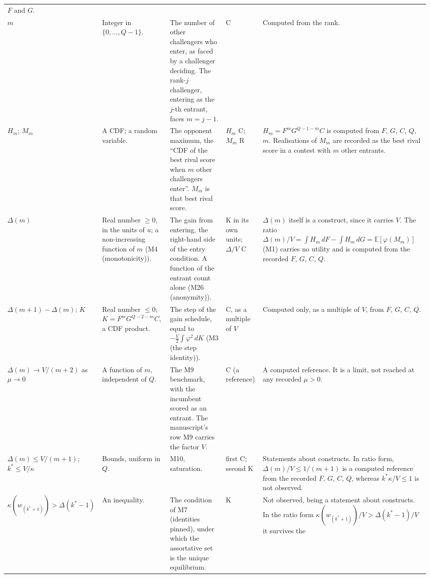 \documentclass[11pt]{article}
\begin{document}
\begin{longtable}{@{}P{1.9cm}P{2.4cm}P{4.5cm}P{1.7cm}P{4.7cm}@{}}
  $F$ and $G$. \\ \addlinespace
$m$ & Integer in $\{0,\dots,Q-1\}$. & The number of other challengers who
  enter, as faced by a challenger deciding. The rank-$j$ challenger,
  entering as the $j$-th entrant, faces $m=j-1$. & C & Computed from the rank. \\ \addlinespace
$H_m$; $M_m$ & A CDF; a random variable. & The opponent maximum, the ``CDF of
  the best rival score when $m$ other challengers enter''. $M_m$ is that best
  rival score. & $H_m$ C; $M_m$ R & $H_m=F^mG^{Q-1-m}C$ is computed from $F$, $G$, $C$, $Q$, $m$.
  Realisations of $M_m$ are recorded as the best rival score in a contest with
  $m$ other entrants. \\ \addlinespace
$\Delta(m)$ & Real number $\ge0$, in the units of $u$; a non-increasing
  function of $m$ (M4 (monotonicity)). & The gain from entering, the
  right-hand side of the entry condition. A function of the entrant count
  alone (M26 (anonymity)). & K in its own units; $\Delta/V$ C & $\Delta(m)$ itself is a construct, since
  it carries $V$. The ratio
  $\Delta(m)/V=\int H_m\,dF-\int H_m\,dG=\mathbb E[\varphi(M_m)]$ (M1) carries
  no utility and is computed from the recorded $F$, $G$, $C$, $Q$. \\ \addlinespace
$\Delta(m{+}1)-\Delta(m)$; $K$ & Real number $\le0$; $K=F^mG^{Q-2-m}C$, a
  CDF product. & The step of the gain schedule, equal to
  $-\tfrac V2\int\varphi^2\,dK$ (M3 (the step identity)). & C, as a multiple of $V$ & Computed only, as a
  multiple of $V$, from $F$, $G$, $C$, $Q$. \\ \addlinespace
$\Delta(m)\to V/(m{+}2)$ as $\mu\to0$ & A function of $m$, independent of
  $Q$. & The M9 benchmark, with the incumbent scored as an entrant. The manuscript's row M9
  carries the factor $V$. & C (a reference) & A computed reference. It is a limit,
  not reached at any recorded $\mu>0$. \\ \addlinespace
$\Delta(m)\le V/(m{+}1)$; $k^*\le V/\kappa$ & Bounds, uniform in $Q$. & M10,
  saturation. & first C; second K & Statements about constructs. In ratio form,
  $\Delta(m)/V\le1/(m{+}1)$ is a computed reference from the recorded $F$,
  $G$, $C$, $Q$, whereas $k^*\kappa/V\le1$ is not observed. \\ \addlinespace
$\kappa(w_{(k^*+1)})>\Delta(k^*-1)$ & An inequality. & The condition of
  M7 (identities pinned), under which the assortative set is
  the unique equilibrium. & K & Not observed, being a statement about constructs.
  In the ratio form $\kappa(w_{(k^*+1)})/V>\Delta(k^*-1)/V$ it survives the

\end{longtable}
\end{document}
